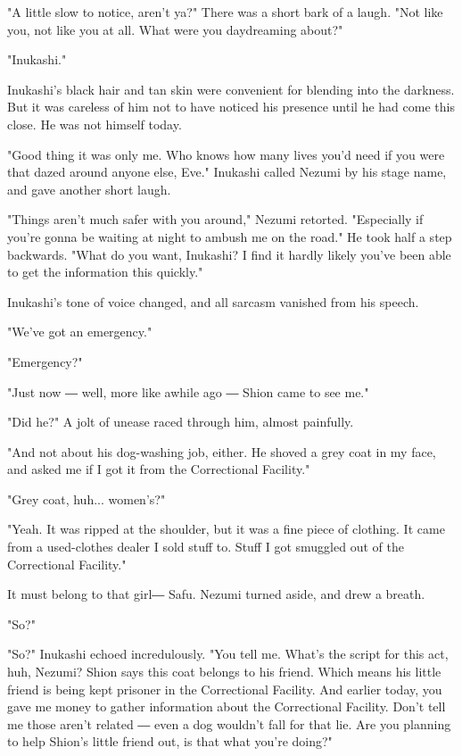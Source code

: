 "A little slow to notice, aren't ya?" There was a short bark of a laugh.
"Not like you, not like you at all. What were you daydreaming about?"

"Inukashi."

Inukashi's black hair and tan skin were convenient for blending into the
darkness. But it was careless of him not to have noticed his presence
until he had come this close. He was not himself today.

"Good thing it was only me. Who knows how many lives you'd need if you
were that dazed around anyone else, Eve." Inukashi called Nezumi by his
stage name, and gave another short laugh.

"Things aren't much safer with you around," Nezumi retorted. "Especially
if you're gonna be waiting at night to ambush me on the road." He took
half a step backwards. "What do you want, Inukashi? I find it hardly
likely you've been able to get the information this quickly."

Inukashi's tone of voice changed, and all sarcasm vanished from his
speech.

"We've got an emergency."

"Emergency?"

"Just now ― well, more like awhile ago ― Shion came to see me."

"Did he?" A jolt of unease raced through him, almost painfully.

"And not about his dog-washing job, either. He shoved a grey coat in my
face, and asked me if I got it from the Correctional Facility."

"Grey coat, huh... women's?"

"Yeah. It was ripped at the shoulder, but it was a fine piece of
clothing. It came from a used-clothes dealer I sold stuff to. Stuff I
got smuggled out of the Correctional Facility."

It must belong to that girl― Safu. Nezumi turned aside, and drew a
breath.

"So?"

"So?" Inukashi echoed incredulously. "You tell me. What's the script for
this act, huh, Nezumi? Shion says this coat belongs to his friend. Which
means his little friend is being kept prisoner in the Correctional
Facility. And earlier today, you gave me money to gather information
about the Correctional Facility. Don't tell me those aren't related ―
even a dog wouldn't fall for that lie. Are you planning to help Shion's
little friend out, is that what you're doing?"

